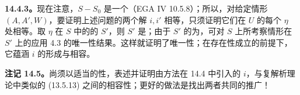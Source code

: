 \textbf{14.4.3。}现在注意，$S-S_0$ 是一个（EGA IV 10.5.8）；所以，对给定情形 $(A,A',W)$，要证明上述问题的两个解 $i,i'$ 相等，只须证明它们在 $U$ 的每个 $\eta$ 处相等。取 $\eta$ 在 $S$ 中的的 $S'$，则 $S'$ 是；由于 $S'$ 的为，可对 $S$ 上所考察情形在 $S'$ 上的应用 4.3 的唯一性结果。这样就证明了唯一性；在存在性成立的前提下，它蕴涵 $i$ 的形成与相容。

\textbf{注记 14.5。}尚须以适当的性，表述并证明由方法在 14.4 中引入的 $i$，与复解析理论中类似的 (13.5.13) 之间的相容性；更好的做法是找出两者共同的推广！

